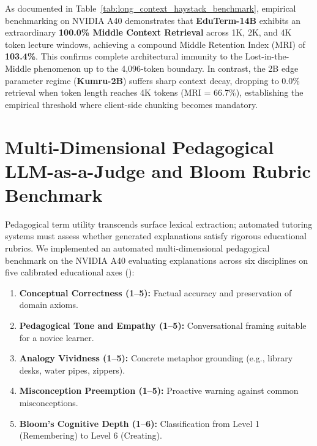\documentclass[a4paper,12pt]{report}
\begin{document}
As documented in Table~\ref{tab:long_context_haystack_benchmark}, empirical benchmarking on NVIDIA A40 demonstrates that \textbf{EduTerm-14B} exhibits an extraordinary \textbf{100.0\% Middle Context Retrieval} across 1K, 2K, and 4K token lecture windows, achieving a compound Middle Retention Index (MRI) of \textbf{103.4\%}. This confirms complete architectural immunity to the Lost-in-the-Middle phenomenon up to the 4,096-token boundary. In contrast, the 2B edge parameter regime (\textbf{Kumru-2B}) suffers sharp context decay, dropping to $0.0\%$ retrieval when token length reaches 4K tokens (MRI = 66.7\%), establishing the empirical threshold where client-side chunking becomes mandatory.


\section{Multi-Dimensional Pedagogical LLM-as-a-Judge and Bloom Rubric Benchmark}
\label{sec:bloom_taxonomy_benchmark}
Pedagogical term utility transcends surface lexical extraction; automated tutoring systems must assess whether generated explanations satisfy rigorous educational rubrics. We implemented an automated multi-dimensional pedagogical benchmark on the NVIDIA A40 evaluating explanations across six disciplines on five calibrated educational axes ():
\begin{enumerate}
    \item \textbf{Conceptual Correctness (1--5):} Factual accuracy and preservation of domain axioms.
    \item \textbf{Pedagogical Tone and Empathy (1--5):} Conversational framing suitable for a novice learner.
    \item \textbf{Analogy Vividness (1--5):} Concrete metaphor grounding (e.g., library desks, water pipes, zippers).
    \item \textbf{Misconception Preemption (1--5):} Proactive warning against common misconceptions.
    \item \textbf{Bloom's Cognitive Depth (1--6):} Classification from Level 1 (Remembering) to Level 6 (Creating).
\end{enumerate}
\end{document}
